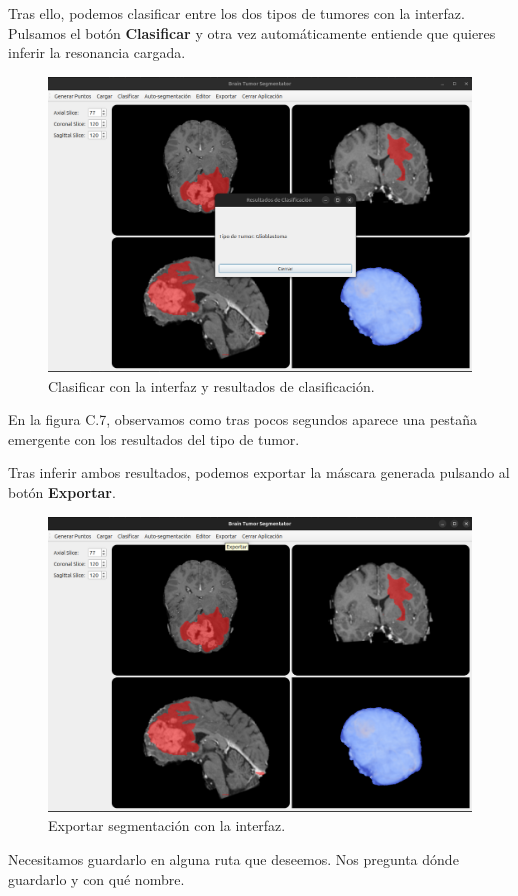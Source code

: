 Tras ello, podemos clasificar entre los dos tipos de tumores con la interfaz. Pulsamos el botón \textbf{Clasificar} y otra vez automáticamente entiende que quieres inferir la resonancia cargada.

\begin{figure}[H]
	\centering
	\includegraphics[width=0.7\linewidth]{imagenes/interfaz_clasificacion.png}
	\caption{Clasificar con la interfaz y resultados de clasificación.}
\end{figure}

En la figura C.7, observamos como tras pocos segundos aparece una pestaña emergente con los resultados del tipo de tumor.

Tras inferir ambos resultados, podemos exportar la máscara generada pulsando al botón \textbf{Exportar}. 

\begin{figure}[H]
	\centering
	\includegraphics[width=0.7\linewidth]{imagenes/interfaz_exportar.png}
	\caption{Exportar segmentación con la interfaz.}
\end{figure}

Necesitamos guardarlo en alguna ruta que deseemos. Nos pregunta dónde guardarlo y con qué nombre. 

